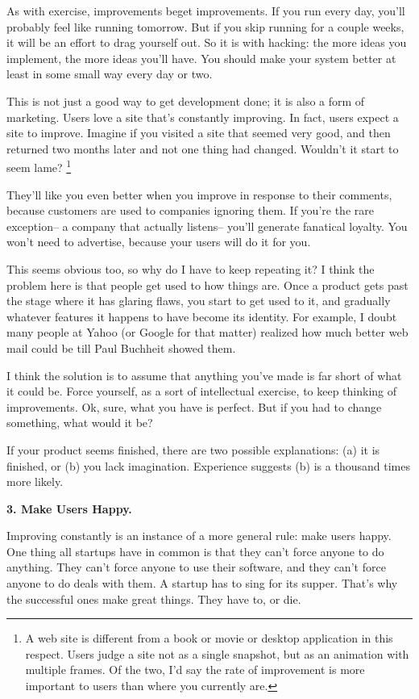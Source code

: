 \documentclass[12pt]{book}
\begin{document}
As with exercise, improvements beget improvements. If you run every day,
you'll probably feel like running tomorrow. But if you skip running for
a couple weeks, it will be an effort to drag yourself out. So it is with
hacking: the more ideas you implement, the more ideas you'll have. You
should make your system better at least in some small way every day or
two.

This is not just a good way to get development done; it is also a form
of marketing. Users love a site that's constantly improving. In fact,
users expect a site to improve. Imagine if you visited a site that
seemed very good, and then returned two months later and not one thing
had changed. Wouldn't it start to seem lame? \footnote{A web site is different from a book or movie or desktop
application in this respect. Users judge a site not as a single
snapshot, but as an animation with multiple frames. Of the two, I'd say
the rate of improvement is more important to users than where you
currently are.}

They'll like you even better when you improve in response to their
comments, because customers are used to companies ignoring them. If
you're the rare exception-- a company that actually listens-- you'll
generate fanatical loyalty. You won't need to advertise, because your
users will do it for you.

This seems obvious too, so why do I have to keep repeating it? I think
the problem here is that people get used to how things are. Once a
product gets past the stage where it has glaring flaws, you start to get
used to it, and gradually whatever features it happens to have become
its identity. For example, I doubt many people at Yahoo (or Google for
that matter) realized how much better web mail could be till Paul
Buchheit showed them.

I think the solution is to assume that anything you've made is far short
of what it could be. Force yourself, as a sort of intellectual exercise,
to keep thinking of improvements. Ok, sure, what you have is perfect.
But if you had to change something, what would it be?

If your product seems finished, there are two possible explanations: (a)
it is finished, or (b) you lack imagination. Experience suggests (b) is
a thousand times more likely.

\textbf{3. Make Users Happy.}

Improving constantly is an instance of a more general rule: make users
happy. One thing all startups have in common is that they can't force
anyone to do anything. They can't force anyone to use their software,
and they can't force anyone to do deals with them. A startup has to sing
for its supper. That's why the successful ones make great things. They
have to, or die.
\end{document}
